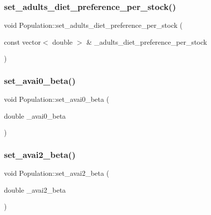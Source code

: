 \mbox{\label{class_population_ae6110f8d8c552f5ee9b905941861880a}} 
\subsubsection{\texorpdfstring{set\_adults\_diet\_preference\_per\_stock()}{set\_adults\_diet\_preference\_per\_stock()}}
{\footnotesize\ttfamily void Population\+::set\+\_\+adults\+\_\+diet\+\_\+preference\+\_\+per\+\_\+stock (\begin{DoxyParamCaption}\item[{const vector$<$ double $>$ \&}]{\+\_\+adults\+\_\+diet\+\_\+preference\+\_\+per\+\_\+stock }\end{DoxyParamCaption})}

\mbox{\label{class_population_af7162106eadd591efe14813b8cd8000d}} 
\subsubsection{\texorpdfstring{set\_avai0\_beta()}{set\_avai0\_beta()}}
{\footnotesize\ttfamily void Population\+::set\+\_\+avai0\+\_\+beta (\begin{DoxyParamCaption}\item[{double}]{\+\_\+avai0\+\_\+beta }\end{DoxyParamCaption})}

\mbox{\label{class_population_a254b6196bc625b6a1046bbb82fb4d9f3}} 
\subsubsection{\texorpdfstring{set\_avai2\_beta()}{set\_avai2\_beta()}}
{\footnotesize\ttfamily void Population\+::set\+\_\+avai2\+\_\+beta (\begin{DoxyParamCaption}\item[{double}]{\+\_\+avai2\+\_\+beta }\end{DoxyParamCaption})}

